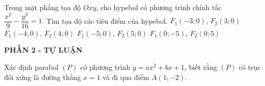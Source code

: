 \begin{ex}%
	Trong mặt phẳng tọa độ $Oxy$, cho hypebol có phương trình chính tắc $\dfrac{x^2}{9}-\dfrac{y^2}{16}=1$. Tìm tọa độ các tiêu điểm của hypebol.
	\choice
	{$F_1(-3;0)$, $F_2(3;0)$}
	{$F_1(-4;0)$, $F_2(4;0)$}
	{\True $F_1(-5;0)$, $F_2(5;0)$}
	{$F_1(0;-5)$, $F_2(0;5)$}
\end{ex}



\begin{center}
	\textbf{PHẦN 2 - TỰ LUẬN}
\end{center}

\begin{bt}%
Xác định parabol $(P)$ có phương trình $y=ax^2+bx+1$, biết rằng $(P)$ có trục đối xứng là đường thẳng $x=1$ và đi qua điểm $A(1;-2)$.
\end{bt}

